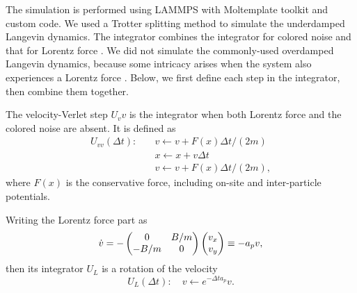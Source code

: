 \documentclass[
 amsmath,amssymb,
 aps,
 pre,
 longbibliography,
 10pt, onecolumn,
 notitlepage
]{revtex4-1}
\begin{document}
The simulation is performed using LAMMPS \cite{Plimpton1995FastParallel} with Moltemplate toolkit \cite{Jewett2013MoltemplateCoarseGrained} and custom code.
We used a Trotter splitting method \cite{Tuckerman1992ReversibleMultiple,Bussi2007AccurateSampling} to simulate the underdamped Langevin dynamics.
The integrator combines the integrator for colored noise \cite{Ceriotti2010ColoredNoiseThermostats} and that for Lorentz force \cite{Chin2008SymplecticEnergyconserving}.
We did not simulate the commonly-used overdamped Langevin dynamics, because some intricacy arises when the system also experiences a Lorentz force \cite{Chun2018EmergenceNonwhite}.
Below, we first define each step in the integrator, then combine them together.

The velocity-Verlet step $U_vv$ is the integrator when both Lorentz force and the colored noise are absent. It is defined as
\begin{align}
U_{vv}(\Delta t):\quad
&v \leftarrow v + F(x) \Delta t / (2m) \\
&x \leftarrow x + v \Delta t \\
&v \leftarrow v + F(x) \Delta t / (2m),
\end{align}
where $F(x)$ is the conservative force, including on-site and inter-particle potentials.

Writing the Lorentz force part as
\begin{equation}
\dot{v} = -\pmqty{ 0 & B/m \\ -B/m & 0 } \pmqty{ v_x \\ v_y }
\equiv -a_p v ,
\end{equation}
then its integrator $U_L$ is a rotation of the velocity
\begin{equation}
    U_{L}(\Delta t):\quad
    v \leftarrow e^{-\Delta t a_p} v .
\end{equation}
\end{document}
